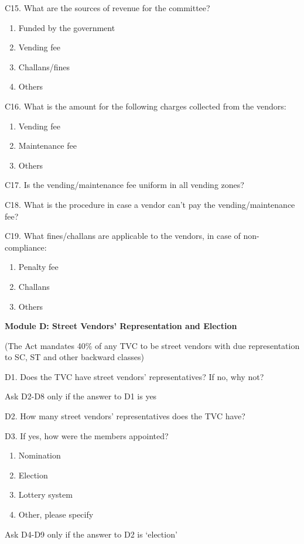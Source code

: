 \documentclass[a4paper, 12pt, twoside]{article}
\begin{document}
{{\begin{mdframed}[backgroundcolor=gray!20]
\begin{enumerate}
C15. What are the sources of revenue for the committee?
\begin{enumerate}[nosep]
\item Funded by the government
\item Vending fee
\item Challans/fines
\item Others
\end{enumerate}


C16. What is the amount for the following charges collected from the vendors:
\begin{enumerate}[nosep]
\item Vending fee
\item Maintenance fee
\item Others
\end{enumerate}


C17. Is the vending/maintenance fee uniform in all vending zones?


C18. What is the procedure in case a vendor can’t pay the vending/maintenance fee?


C19. What fines/challans are applicable to the vendors, in case of non-compliance:
\begin{enumerate}[nosep]
\item Penalty fee
\item Challans
\item Others
\end{enumerate}

\textbf{Module D: Street Vendors’ Representation and Election}

(The Act mandates 40\% of any TVC to be street vendors with due representation to SC, ST and other backward classes)

D1. Does the TVC have street vendors’ representatives? If no, why not?

Ask D2-D8 only if the answer to D1 is yes

D2. How many street vendors’ representatives does the TVC have?

D3. If yes, how were the members appointed?
\begin{enumerate}[nosep]
\item Nomination
\item Election
\item Lottery system
\item Other, please specify
\end{enumerate}

Ask D4-D9 only if the answer to D2 is ‘election’


\end{enumerate}
\end{mdframed}}}
\end{document}
